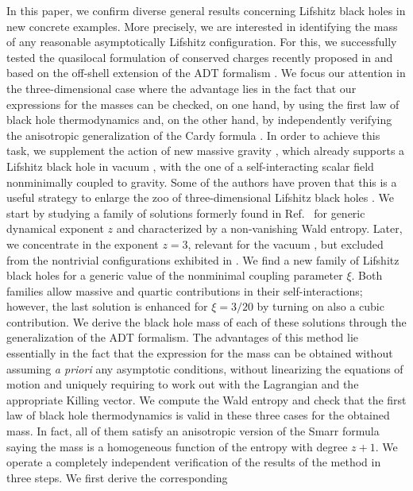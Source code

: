\documentclass[prd,twocolumn,superscriptaddress,amsmath,amssymb,nofootinbib]{revtex4-1}
\begin{document}
In this paper, we confirm diverse general results concerning
Lifshitz black holes in new concrete examples. More precisely,
we are interested in identifying the mass of any reasonable
asymptotically Lifshitz configuration. For this, we
successfully tested the quasilocal formulation of conserved
charges recently proposed in \cite{Kim:2013zha,Gim:2014nba} and
based on the off-shell extension of the ADT formalism
\cite{Abbott:1981ff}. We focus our attention in the
three-dimensional case where the advantage lies in the fact
that our expressions for the masses can be checked, on one hand,
by using the first law of black hole thermodynamics and, on the
other hand, by independently verifying the anisotropic
generalization of the Cardy formula \cite{Gonzalez:2011nz}. In
order to achieve this task, we supplement the action of new massive gravity \cite{Bergshoeff:2009hq}, which already supports
a Lifshitz black hole in vacuum \cite{AyonBeato:2009nh}, with
the one of a self-interacting scalar field nonminimally coupled
to gravity. Some of the authors have proven that this is a
useful strategy to enlarge the zoo of three-dimensional
Lifshitz black holes \cite{Correa:2014ika}. We start by
studying a family of solutions formerly found in
Ref.~\cite{Correa:2014ika} for generic dynamical exponent $z$
and characterized by a non-vanishing Wald entropy. Later, we
concentrate in the exponent $z=3$, relevant for the vacuum
\cite{AyonBeato:2009nh}, but excluded from the nontrivial
configurations exhibited in \cite{Correa:2014ika}. We find a
new family of Lifshitz black holes for a generic value of the
nonminimal coupling parameter $\xi$. Both families allow
massive and quartic contributions in their self-interactions;
however, the last solution is enhanced for $\xi=3/20$ by
turning on also a cubic contribution. We derive the black hole
mass of each of these solutions through the generalization of
the ADT formalism. The advantages of this method lie
essentially in the fact that the expression for the mass can be
obtained without assuming \emph{a priori} any asymptotic conditions,
without linearizing the equations of motion and uniquely
requiring to work out with the Lagrangian and the appropriate
Killing vector. We compute the Wald entropy and check that the
first law of black hole thermodynamics is valid in these three
cases for the obtained mass. In fact, all of them satisfy an
anisotropic version of the Smarr formula saying the mass is a
homogeneous function of the entropy with degree $z+1$. We
operate a completely independent verification of the results of
the method in three steps. We first derive the corresponding
\end{document}
